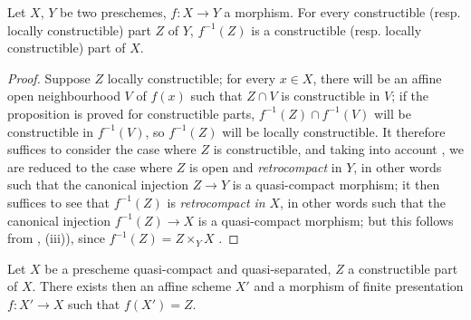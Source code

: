 \begin{proposition}[1.8.2]
\label{IV.1.8.2}
Let $X$, $Y$ be two preschemes, $f:X\to Y$ a morphism.
For every constructible (resp. locally constructible) part $Z$ of $Y$, $f^{-1}(Z)$ is a constructible (resp. locally constructible) part of $X$.
\end{proposition}

\begin{proof}
Suppose $Z$ locally constructible; for every $x\in X$, there will be an affine open neighbourhood $V$ of $f(x)$ such that $Z\cap V$ is constructible in $V$; if the proposition is proved for constructible parts, $f^{-1}(Z)\cap f^{-1}(V)$ will be constructible in $f^{-1}(V)$, so $f^{-1}(Z)$ will be locally constructible.
It therefore suffices to consider the case where $Z$ is constructible, and taking into account , we are reduced to the case where $Z$ is open and \emph{retrocompact} in $Y$, in other words such that the canonical injection $Z\to Y$ is a quasi-compact morphism; it then suffices to see that $f^{-1}(Z)$ is \emph{retrocompact in} $X$, in other words such that the canonical injection $f^{-1}(Z)\to X$ is a quasi-compact morphism; but this follows from , (iii)), since $f^{-1}(Z)=Z\times_Y X$ .
\end{proof}

\begin{lemma}[1.8.3]
\label{IV.1.8.3}
Let $X$ be a prescheme quasi-compact and quasi-separated, $Z$ a constructible part of $X$.
There exists then an affine scheme $X'$ and a morphism of finite presentation $f:X'\to X$ such that $f(X')=Z$.
\end{lemma}

